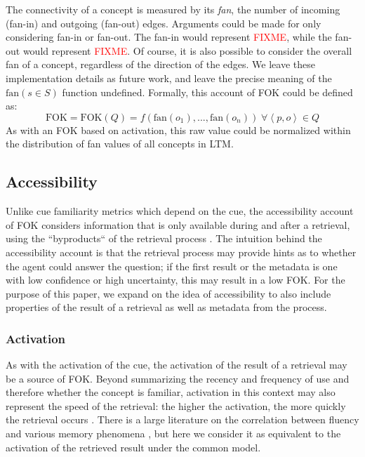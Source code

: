 \documentclass[10pt,letterpaper]{article}
\newcommand{\fixme}[2][]{#2}
\renewcommand{\fixme}[2][]{\textcolor{red}{#2}}
\newcommand{\tuple}[1]{\left \langle #1 \right \rangle }
\newcommand{\fok}[0]{\text{FOK}}
\begin{document}
The connectivity of a concept is measured by its \textit{fan}, the number of incoming (fan-in) and outgoing (fan-out) edges.
Arguments could be made for only considering fan-in or fan-out.
The fan-in would represent \fixme{FIXME}, while the fan-out would represent \fixme{FIXME}.
Of course, it is also possible to consider the overall fan of a concept, regardless of the direction of the edges.
We leave these implementation details as future work, and leave the precise meaning of the $\text{fan}(s{\in}S)$ function undefined.
Formally, this account of FOK could be defined as:
$$\fok = \fok(Q) = f\left(\text{fan}(o_1), ..., \text{fan}(o_n)\right) \; \forall {\tuple{p, o}{\in}Q}$$
As with an FOK based on activation, this raw value could be normalized within the distribution of fan values of all concepts in LTM.


\subsection{Accessibility}

Unlike cue familiarity metrics which depend on the cue, the accessibility account of FOK considers information that is only available during and after a retrieval, using the ``byproducts`` of the retrieval process \cite{Koriat1993HowDoWe}.
The intuition behind the accessibility account is that the retrieval process may provide hints as to whether the agent could answer the question; if the first result or the metadata is one with low confidence or high uncertainty, this may result in a low FOK.
For the purpose of this paper, we expand on the idea of accessibility to also include properties of the result of a retrieval as well as metadata from the process.

\subsubsection{Activation}

As with the activation of the cue, the activation of the result of a retrieval may be a source of FOK.
Beyond summarizing the recency and frequency of use and therefore whether the concept is familiar, activation in this context may also represent the speed of the retrieval: the higher the activation, the more quickly the retrieval occurs \cite{Anderson2004AnIntegratedTheory}.
There is a large literature on the correlation between fluency and various memory phenomena \cite{Alter2009UnitingTheTribes}, but here we consider it as equivalent to the activation of the retrieved result under the common model.
\end{document}
